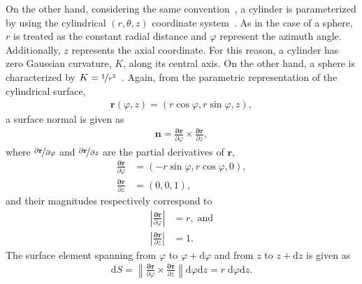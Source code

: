 On the other hand, considering the same convention~\cite{ISO2019Standard}, a cylinder is parameterized by using the cylindrical $(r, \theta, z)$ coordinate system~\cite{Sokolov2023Cylindrical}.
As in the case of a sphere, $r$ is treated as the constant radial distance and $\varphi$ represent the azimuth angle.
Additionally, $z$ represents the axial coordinate.
For this reason, a cylinder has zero Gaussian curvature, $K$, along its central axis.
On the other hand, a sphere is characterized by $K = \nicefrac{1}{r^2}$~\cite{Shikin2023Gaussian}.
Again, from the parametric representation of the cylindrical surface,
\begin{align}
    \mathbf{r}(\varphi, z) = \left( r \cos\varphi, r \sin \varphi, z \right),
\end{align}
a surface normal is given as
\begin{align}
    \mathbf{n} = \frac{\mathbf{\partial r}}{\partial \varphi} \times \frac{\mathbf{\partial r}}{\partial z},
\end{align}
where $\nicefrac{\mathbf{\partial r}}{\partial \varphi}$ and $\nicefrac{\mathbf{\partial r}}{\partial z}$ are the partial derivatives of $\mathbf{r}$,
\begin{align}
    \frac{\mathbf{\partial r}}{\partial \varphi} &= \left( -r \sin\varphi, r \cos\varphi, 0 \right), \\
    \frac{\mathbf{\partial r}}{\partial z} &= \left( 0, 0, 1 \right),
\end{align}
and their magnitudes respectively correspond to
\begin{align}
    \left| \frac{\mathbf{\partial r}}{\partial \varphi} \right| &= r, \; \text{and}\\
    \left| \frac{\mathbf{\partial r}}{\partial z} \right| &= 1.
\end{align}
The surface element spanning from $\varphi$ to $\varphi + \mathrm{d}\varphi$ and from $z$ to $z + \mathrm{d}z$ is given as
\begin{align}
    \mathrm{d}S = \left\| \frac{\mathbf{\partial r}}{\partial \varphi} \times \frac{\mathbf{\partial r}}{\partial z} \right\| \mathrm{d}\varphi \mathrm{d}z = r \; \mathrm{d}\varphi \mathrm{d}z.
\end{align}

